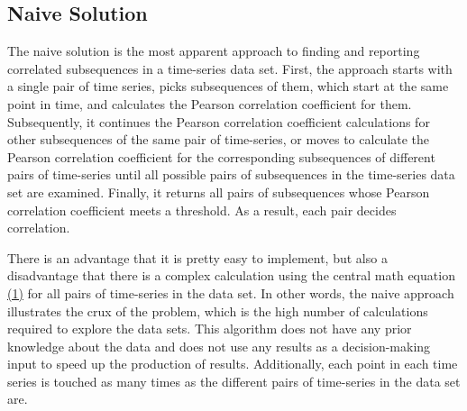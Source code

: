 \subsection{Naive Solution}
The naive solution is the most apparent approach to finding and reporting correlated subsequences in a time-series data set. First, the approach starts with a single pair of time series, picks subsequences of them, which start at the same point in time, and calculates the Pearson correlation coefficient for them. Subsequently, it continues the Pearson correlation coefficient calculations for other subsequences of the same pair of time-series, or moves to calculate the Pearson correlation coefficient for the corresponding subsequences of different pairs of time-series until all possible pairs of subsequences in the time-series data set are examined. Finally, it returns all pairs of subsequences whose Pearson correlation coefficient meets a threshold. As a result, each pair decides correlation.\newline 

There is an advantage that it is pretty easy to implement, but also a disadvantage that there is a complex calculation using the central math equation \hyperref[equ:1]{(1)} for all pairs of time-series in the data set. In other words, the naive approach illustrates the crux of the problem, which is the high number of calculations required to explore the data sets. This algorithm does not have any prior knowledge about the data and does not use any results as a decision-making input to speed up the production of results. Additionally, each point in each time series is touched as many times as the different pairs of time-series in the data set are.

